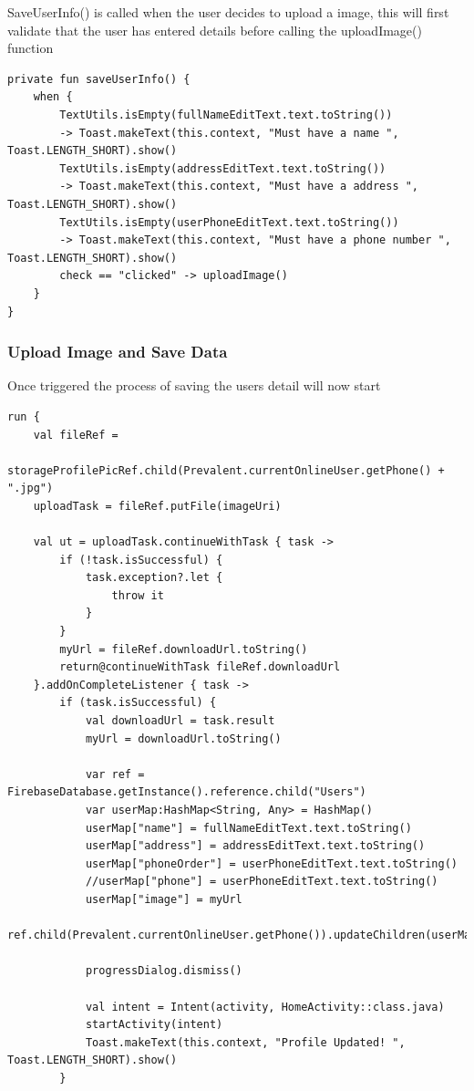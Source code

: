 SaveUserInfo() is called when the user decides to upload a image, this will first validate that the user has entered details before calling the uploadImage() function

\begin{verbatim}
private fun saveUserInfo() {
    when {
        TextUtils.isEmpty(fullNameEditText.text.toString()) 
        -> Toast.makeText(this.context, "Must have a name ", Toast.LENGTH_SHORT).show()
        TextUtils.isEmpty(addressEditText.text.toString()) 
        -> Toast.makeText(this.context, "Must have a address ", Toast.LENGTH_SHORT).show()
        TextUtils.isEmpty(userPhoneEditText.text.toString()) 
        -> Toast.makeText(this.context, "Must have a phone number ", Toast.LENGTH_SHORT).show()
        check == "clicked" -> uploadImage()
    }
}
\end{verbatim}
\newpage
\subsubsection{Upload Image and Save Data}
Once triggered the process of saving the users detail will now start
\begin{verbatim}
run {
    val fileRef =
        storageProfilePicRef.child(Prevalent.currentOnlineUser.getPhone() + ".jpg")
    uploadTask = fileRef.putFile(imageUri)

    val ut = uploadTask.continueWithTask { task ->
        if (!task.isSuccessful) {
            task.exception?.let {
                throw it
            }
        }
        myUrl = fileRef.downloadUrl.toString()
        return@continueWithTask fileRef.downloadUrl
    }.addOnCompleteListener { task ->
        if (task.isSuccessful) {
            val downloadUrl = task.result
            myUrl = downloadUrl.toString()

            var ref = FirebaseDatabase.getInstance().reference.child("Users")
            var userMap:HashMap<String, Any> = HashMap()
            userMap["name"] = fullNameEditText.text.toString()
            userMap["address"] = addressEditText.text.toString()
            userMap["phoneOrder"] = userPhoneEditText.text.toString()
            //userMap["phone"] = userPhoneEditText.text.toString()
            userMap["image"] = myUrl
            ref.child(Prevalent.currentOnlineUser.getPhone()).updateChildren(userMap)

            progressDialog.dismiss()

            val intent = Intent(activity, HomeActivity::class.java)
            startActivity(intent)
            Toast.makeText(this.context, "Profile Updated! ", Toast.LENGTH_SHORT).show()
        }
      
\end{verbatim}
\newpage


